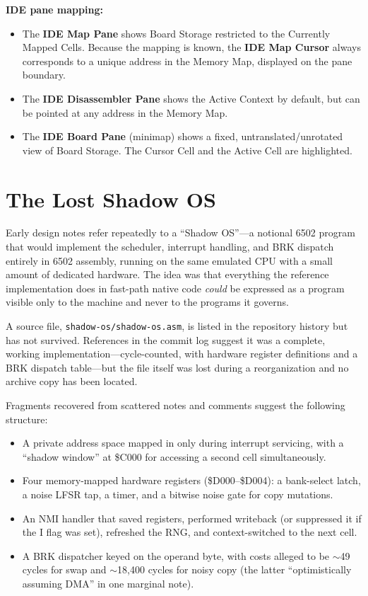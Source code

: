 \documentclass{article}
\begin{document}
\medskip\noindent
\textbf{IDE pane mapping:}
\begin{itemize}
  \item The \textbf{IDE Map Pane} shows Board Storage restricted to the
    Currently Mapped Cells.  Because the mapping is known, the
    \textbf{IDE Map Cursor} always corresponds to a unique address in
    the Memory Map, displayed on the pane boundary.
  \item The \textbf{IDE Disassembler Pane} shows the Active Context by
    default, but can be pointed at any address in the Memory Map.
  \item The \textbf{IDE Board Pane} (minimap) shows a fixed,
    untranslated/unrotated view of Board Storage. The Cursor Cell and
    the Active Cell are highlighted.
\end{itemize}

\section{The Lost Shadow OS}
\label{sec:shadow-os}


Early design notes refer repeatedly to a ``Shadow OS''---a notional 6502
program that would implement the scheduler, interrupt handling, and BRK
dispatch entirely in 6502 assembly, running on the same emulated CPU with
a small amount of dedicated hardware. The idea was that everything the
reference implementation does in fast-path native code \emph{could} be
expressed as a program visible only to the machine and never to the
programs it governs.

A source file, \texttt{shadow-os/shadow-os.asm}, is listed in the
repository history but has not survived. References in the commit log
suggest it was a complete, working implementation---cycle-counted, with
hardware register definitions and a BRK dispatch table---but the file
itself was lost during a reorganization and no archive copy has been
located.

Fragments recovered from scattered notes and comments suggest the
following structure:

\begin{itemize}
\item A private address space mapped in only during interrupt servicing,
  with a ``shadow window'' at \$C000 for accessing a second cell
  simultaneously.
\item Four memory-mapped hardware registers (\$D000--\$D004):
  a bank-select latch, a noise LFSR tap, a timer, and a bitwise
  noise gate for copy mutations.
\item An NMI handler that saved registers, performed writeback (or
  suppressed it if the I flag was set), refreshed the RNG, and
  context-switched to the next cell.
\item A BRK dispatcher keyed on the operand byte, with costs alleged to
  be $\sim$49 cycles for swap and $\sim$18{,}400 cycles for noisy copy
  (the latter ``optimistically assuming DMA'' in one marginal note).
\end{itemize}
\end{document}
